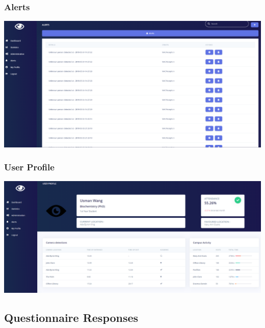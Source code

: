 \documentclass[
  english,
  a4paper,
,tablecaptionabove
]{scrartcl}
\begin{document}
\hypertarget{alerts}{%
\subsubsection{Alerts}\label{alerts}}

\includegraphics{images/ppm-images/alerts.png} \newpage

\hypertarget{user-profile}{%
\subsubsection{User Profile}\label{user-profile}}

\includegraphics{images/ppm-images/user-profile.png} \newpage

\hypertarget{questionnaire-responses}{%
\subsection{Questionnaire Responses}\label{questionnaire-responses}}
\end{document}
